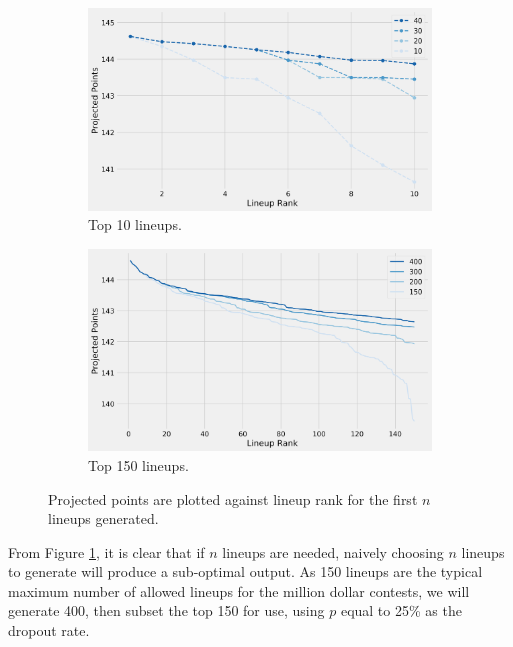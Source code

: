 \documentclass[12pt]{article}
\begin{document}
\begin{figure}[H]
  \centering
  \begin{subfigure}[b]{0.80\textwidth}
    \centering
    \includegraphics[width=1\textwidth]{../figures/lineups10_vs_n}
    \caption{Top 10 lineups.}
  \end{subfigure}
  \par\bigskip
  \begin{subfigure}[b]{0.80\textwidth}
    \centering
    \includegraphics[width=1\textwidth]{../figures/lineups150_vs_n}
    \caption{Top 150 lineups.}
  \end{subfigure}
  \caption{Projected points are plotted against lineup rank for the first $n$ lineups generated.}
\label{lineups_vs_n}
\end{figure}

From Figure \ref{lineups_vs_n}, it is clear that if $n$ lineups are needed, naively choosing $n$ lineups to generate will produce a sub-optimal output. As 150 lineups are the typical maximum number of allowed lineups for the million dollar contests, we will generate 400, then subset the top 150 for use, using $p$ equal to 25\% as the dropout rate. \bigskip
\end{document}
